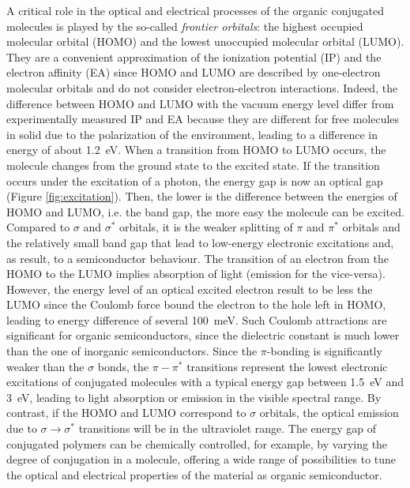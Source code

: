 \documentclass  [
  paper    = a4,
  BCOR     = 10mm,
  twoside,
  fontsize = 12pt,
  fleqn,
  toc      = bibnumbered,
  toc      = listofnumbered,
  numbers  = noendperiod,
  headings = normal,
  listof   = leveldown,
  version  = 3.03
]                                       {scrreprt}
\begin{document}
A critical role in the optical and electrical processes of the organic conjugated molecules is played by the so-called \emph{frontier orbitals}: the highest occupied molecular orbital (HOMO) and the lowest unoccupied molecular orbital (LUMO). They are a convenient approximation of the ionization potential (IP) and the electron affinity (EA) since HOMO and LUMO are described by one-electron molecular orbitals and do not consider electron-electron interactions. Indeed, the difference between HOMO and LUMO with the vacuum energy level differ from experimentally measured IP and EA because they are different for free molecules in solid due to the polarization of the environment, leading to a difference in energy of about \SI{1.2}{\electronvolt}. When a transition from HOMO to LUMO occurs, the molecule changes from the ground state to the excited state. If the transition occurs under the excitation of a photon, the energy gap is now an optical gap (Figure \ref{fig:excitation}). Then, the lower is the difference between the energies of HOMO and LUMO, i.e. the band gap, the more easy the molecule can be excited. Compared to $\sigma$ and $\sigma^*$ orbitals, it is the weaker splitting of $\pi$ and $\pi^*$ orbitals and the relatively small band gap that lead to low-energy electronic excitations and, as result, to a semiconductor behaviour. The transition of an electron from the HOMO to the LUMO implies absorption of light (emission for the vice-versa). However, the energy level of an optical excited electron result to be less the LUMO since the Coulomb force bound the electron to the hole left in HOMO, leading to energy difference of several \SI{100}{\milli\electronvolt}. Such Coulomb attractions are significant for organic semiconductors, since the dielectric constant is much lower than the one of inorganic semiconductors. Since the $\pi$-bonding is significantly weaker than the $\sigma$ bonds, the $\pi-\pi^*$ transitions represent the lowest electronic excitations of conjugated molecules with a typical energy gap between \SI{1.5}{\electronvolt} and \SI{3}{\electronvolt}, leading to light absorption or emission in the visible spectral range. By contrast, if the HOMO and LUMO correspond to $\sigma$ orbitals, the optical emission due to $\sigma\rightarrow\sigma^*$ transitions will be in the ultraviolet range. The energy gap of conjugated polymers can be chemically controlled, for example, by varying the degree of conjugation in a molecule, offering a wide range of possibilities to tune the optical and electrical properties of the material as organic semiconductor. \\
\end{document}
